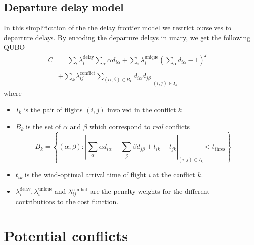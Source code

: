 \documentclass{article}
\begin{document}
\subsection{Departure delay model}
In this simplification of the the delay frontier model we restrict ourselves to departure delays. 
By encoding the departure delays in unary, we get the following QUBO
\begin{align*}
    C &= \sum_i \lambda^\text{delay}_i \sum_\alpha \alpha d_{i\alpha}
       + \sum_i \lambda^\text{unique}_i \left( \sum_\alpha d_{i\alpha} - 1 \right)^2 \\
      &+ \sum_k \left. \lambda^\text{conflict}_{ij} \sum_{(\alpha, \beta) \in B_k} d_{i\alpha} d_{j\beta} \right|_{(i,j)\in I_k}
\end{align*}
where
\begin{itemize}
    \item $I_k$ is the pair of flights $(i, j)$ involved in the conflict $k$ 
    \item $B_k$ is the set of $\alpha$ and $\beta$ which correspond to \emph{real} conflicts
        \begin{equation*}
            B_k = \left\{(\alpha, \beta) : \left| \sum_\alpha \alpha d_{i\alpha} -\sum_\beta \beta d_{j\beta} + t_{ik} - t_{jk} \right|_{(i,j)\in I_k} < t_\text{thres} \right\}
        \end{equation*}
    \item $t_{ik}$ is the wind-optimal arrival time of flight $i$ at the conflict $k$.
    \item $\lambda^\text{delay}_{i}, \lambda^\text{unique}_{i}$ and $\lambda^\text{conflict}_{ij}$ are the penalty weights for the different contributions to the cost function.
\end{itemize}

\newpage
\appendix
\section{Potential conflicts}
\label{app:potential_conflicts}
\end{document}
